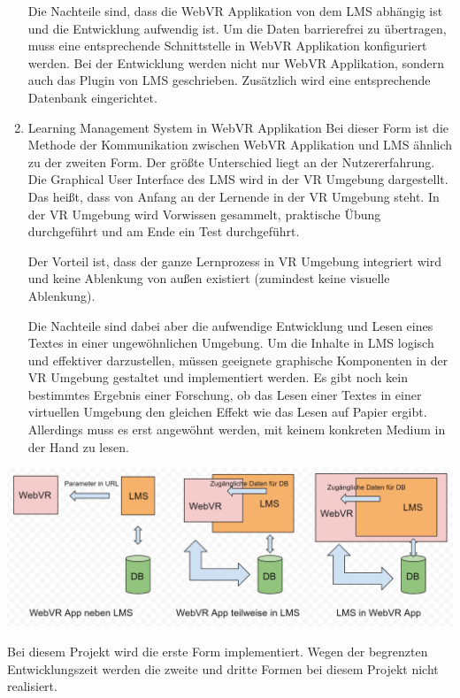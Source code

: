 \begin{enumerate}
     Die Nachteile sind, dass die WebVR Applikation von dem LMS abhängig ist und die Entwicklung aufwendig ist. Um die Daten barrierefrei zu übertragen, muss eine entsprechende Schnittstelle in WebVR Applikation konfiguriert werden. Bei der Entwicklung werden nicht nur WebVR Applikation, sondern auch das Plugin von LMS geschrieben. Zusätzlich wird eine entsprechende Datenbank eingerichtet.
     
   \item Learning Management System in WebVR Applikation
     \subitem Bei dieser Form ist die Methode der Kommunikation zwischen WebVR Applikation und LMS ähnlich zu der zweiten Form. Der größte Unterschied liegt an der Nutzererfahrung. Die Graphical User Interface des LMS wird in der VR Umgebung dargestellt. Das heißt, dass von Anfang an der Lernende in der VR Umgebung steht. In der VR Umgebung wird Vorwissen gesammelt, praktische Übung durchgeführt und am Ende ein Test durchgeführt.
     
     Der Vorteil ist, dass der ganze Lernprozess in VR Umgebung integriert wird und keine Ablenkung von außen existiert (zumindest keine visuelle Ablenkung).
     
     Die Nachteile sind dabei aber die aufwendige Entwicklung und Lesen eines Textes in einer ungewöhnlichen Umgebung. Um die Inhalte in LMS logisch und effektiver darzustellen, müssen geeignete graphische Komponenten in der VR Umgebung gestaltet und implementiert werden. Es gibt noch kein bestimmtes Ergebnis einer Forschung, ob das Lesen einer Textes in einer virtuellen Umgebung den gleichen Effekt wie das Lesen auf Papier ergibt. Allerdings muss es erst angewöhnt werden, mit keinem konkreten Medium in der Hand zu lesen.
 \end{enumerate}
\includegraphics[width=\textwidth]{images/formenDerVerbindung.jpg}

Bei diesem Projekt wird die erste Form implementiert. Wegen der begrenzten Entwicklungszeit werden die zweite und dritte Formen bei diesem Projekt nicht realisiert.

